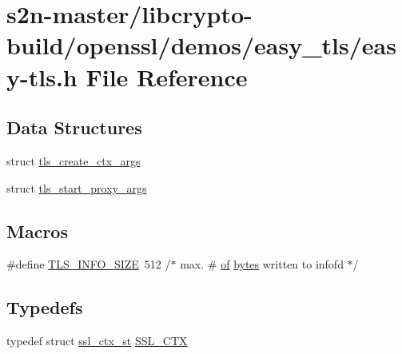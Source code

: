 \hypertarget{easy-tls_8h}{}\section{s2n-\/master/libcrypto-\/build/openssl/demos/easy\+\_\+tls/easy-\/tls.h File Reference}
\label{easy-tls_8h}
\subsection*{Data Structures}
\begin{DoxyCompactItemize}
\item 
struct \hyperlink{structtls__create__ctx__args}{tls\+\_\+create\+\_\+ctx\+\_\+args}
\item 
struct \hyperlink{structtls__start__proxy__args}{tls\+\_\+start\+\_\+proxy\+\_\+args}
\end{DoxyCompactItemize}
\subsection*{Macros}
\begin{DoxyCompactItemize}
\item 
\#define \hyperlink{easy-tls_8h_aa94455b7d59761b0cba2a21aa3f36cae}{T\+L\+S\+\_\+\+I\+N\+F\+O\+\_\+\+S\+I\+ZE}~512      /$\ast$ max. \# \hyperlink{usparc_8cc_a8ded0acb574430fd00c67aaacaeb313b}{of} \hyperlink{include_2openssl_2x509_8h_abbe3a4f96d7d74b301e1121078fe75d8}{bytes} written to infofd $\ast$/
\end{DoxyCompactItemize}
\subsection*{Typedefs}
\begin{DoxyCompactItemize}
\item 
typedef struct \hyperlink{structssl__ctx__st}{ssl\+\_\+ctx\+\_\+st} \hyperlink{easy-tls_8h_a1a21892c1193ee6eb572c2c72d3924ca}{S\+S\+L\+\_\+\+C\+TX}
\end{DoxyCompactItemize}
